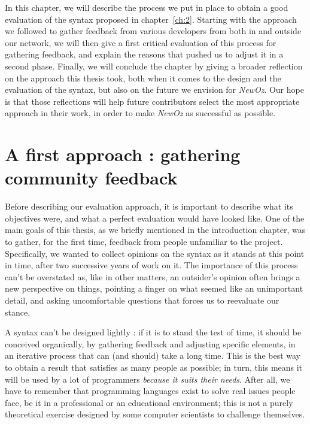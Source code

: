 In this chapter, we will describe the process we put in place to obtain a good evaluation of the syntax proposed in chapter~\ref{ch:2}.
Starting with the approach we followed to gather feedback from various developers from both in and outside our network,
we will then give a first critical evaluation of this process for gathering feedback, and explain the reasons that pushed us to adjust it in a second phase.
Finally, we will conclude the chapter by giving a broader reflection on the approach this thesis took, both when it comes to the design and the evaluation of the syntax, but also on the future we envision for \textit{NewOz}.
Our hope is that those reflections will help future contributors select the most appropriate approach in their work, in order to make \textit{NewOz} as successful as possible.

\section{A first approach : gathering community feedback}\label{sec:ch4-GitHub}
Before describing our evaluation approach, it is important to describe what its objectives were, and what a perfect evaluation would have looked like.\newline
One of the main goals of this thesis, as we briefly mentioned in the introduction chapter, was to gather, for the first time, feedback from people unfamiliar to the project.
Specifically, we wanted to collect opinions on the syntax as it stands at this point in time, after two successive years of work on it.
The importance of this process can't be overstated as, like in other matters, an outsider's opinion often brings a new perspective on things, pointing a finger on what seemed like an unimportant detail, and asking uncomfortable questions that forces us to reevaluate our stance.\newline

A syntax can't be designed lightly : if it is to stand the test of time, it should be conceived organically, by gathering feedback and adjusting specific elements, in an iterative process that can (and should) take a long time.
This is the best way to obtain a result that satisfies as many people as possible;
in turn, this means it will be used by a lot of programmers \emph{because it suits their needs}.
After all, we have to remember that programming languages exist to solve real issues people face, be it in a professional or an educational environment;
this is not a purely theoretical exercise designed by some computer scientists to challenge themselves.\newline

